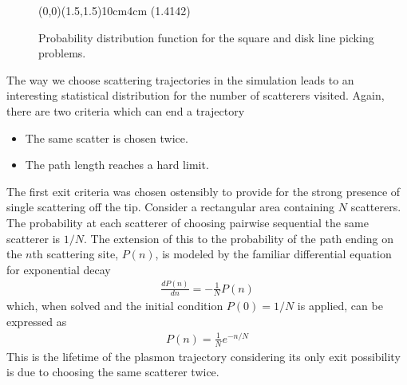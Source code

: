 \begin{figure}
  \begin{center}
    \begin{psgraph}(0,0)(1.5,1.5){10cm}{4cm}
      \psxTick(1.4142){} %
    \end{psgraph}
  \end{center}
  \caption{Probability distribution function for the square and disk line
    picking problems.}
  \label{fig:linepickingpdf}
\end{figure}
The way we choose scattering trajectories in the simulation leads to an
interesting statistical distribution for the number of scatterers visited.
Again, there are two criteria which can end a trajectory
\begin{itemize}
  \item The same scatter is chosen twice.
  \item The path length reaches a hard limit.
\end{itemize}
The first exit criteria was chosen ostensibly to provide for the strong
presence of single scattering off the tip.  Consider a rectangular area
containing $N$ scatterers.  The probability at each scatterer of choosing
pairwise sequential the same scatterer is $1/N$.  The extension of this to
the probability of the path ending on the $n$th scattering site, $P(n)$, is
modeled by the familiar differential equation for exponential decay
\begin{align}
  \frac{d P(n)}{dn} = -\frac{1}{N}P(n)
\end{align}
which, when solved and the initial condition $P(0)=1/N$ is applied, can be
expressed as
\begin{align}
  P(n)=\frac{1}{N}e^{-n/N}
\end{align}
This is the lifetime of the plasmon trajectory considering its only exit
possibility is due to choosing the same scatterer twice.

